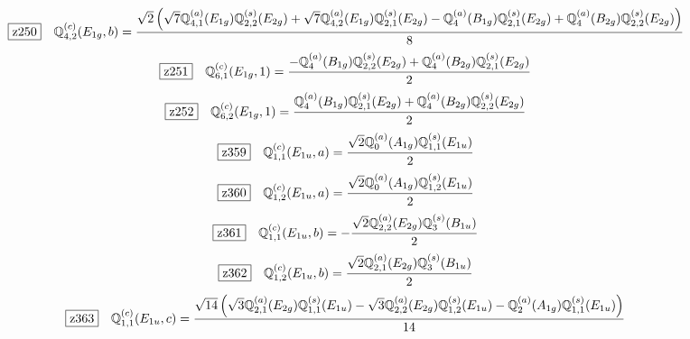 \documentclass[fleqn,10pt,landscape]{jsarticle}
\begin{document}
\begin{dmath*}
\hspace*{3mm}\fbox{z250}\quad \mathbb{Q}_{4,2}^{(c)}(E_{1g},b)=\frac{\sqrt{2} \left(\sqrt{7} \mathbb{Q}_{4,1}^{(a)}(E_{1g}) \mathbb{Q}_{2,2}^{(s)}(E_{2g}) + \sqrt{7} \mathbb{Q}_{4,2}^{(a)}(E_{1g}) \mathbb{Q}_{2,1}^{(s)}(E_{2g}) - \mathbb{Q}_{4}^{(a)}(B_{1g}) \mathbb{Q}_{2,1}^{(s)}(E_{2g}) + \mathbb{Q}_{4}^{(a)}(B_{2g}) \mathbb{Q}_{2,2}^{(s)}(E_{2g})\right)}{8}
\end{dmath*}
\begin{dmath*}
\hspace*{3mm}\fbox{z251}\quad \mathbb{Q}_{6,1}^{(c)}(E_{1g},1)=\frac{- \mathbb{Q}_{4}^{(a)}(B_{1g}) \mathbb{Q}_{2,2}^{(s)}(E_{2g}) + \mathbb{Q}_{4}^{(a)}(B_{2g}) \mathbb{Q}_{2,1}^{(s)}(E_{2g})}{2}
\end{dmath*}
\begin{dmath*}
\hspace*{3mm}\fbox{z252}\quad \mathbb{Q}_{6,2}^{(c)}(E_{1g},1)=\frac{\mathbb{Q}_{4}^{(a)}(B_{1g}) \mathbb{Q}_{2,1}^{(s)}(E_{2g}) + \mathbb{Q}_{4}^{(a)}(B_{2g}) \mathbb{Q}_{2,2}^{(s)}(E_{2g})}{2}
\end{dmath*}
\begin{dmath*}
\hspace*{3mm}\fbox{z359}\quad \mathbb{Q}_{1,1}^{(c)}(E_{1u},a)=\frac{\sqrt{2} \mathbb{Q}_{0}^{(a)}(A_{1g}) \mathbb{Q}_{1,1}^{(s)}(E_{1u})}{2}
\end{dmath*}
\begin{dmath*}
\hspace*{3mm}\fbox{z360}\quad \mathbb{Q}_{1,2}^{(c)}(E_{1u},a)=\frac{\sqrt{2} \mathbb{Q}_{0}^{(a)}(A_{1g}) \mathbb{Q}_{1,2}^{(s)}(E_{1u})}{2}
\end{dmath*}
\begin{dmath*}
\hspace*{3mm}\fbox{z361}\quad \mathbb{Q}_{1,1}^{(c)}(E_{1u},b)=- \frac{\sqrt{2} \mathbb{Q}_{2,2}^{(a)}(E_{2g}) \mathbb{Q}_{3}^{(s)}(B_{1u})}{2}
\end{dmath*}
\begin{dmath*}
\hspace*{3mm}\fbox{z362}\quad \mathbb{Q}_{1,2}^{(c)}(E_{1u},b)=\frac{\sqrt{2} \mathbb{Q}_{2,1}^{(a)}(E_{2g}) \mathbb{Q}_{3}^{(s)}(B_{1u})}{2}
\end{dmath*}
\begin{dmath*}
\hspace*{3mm}\fbox{z363}\quad \mathbb{Q}_{1,1}^{(c)}(E_{1u},c)=\frac{\sqrt{14} \left(\sqrt{3} \mathbb{Q}_{2,1}^{(a)}(E_{2g}) \mathbb{Q}_{1,1}^{(s)}(E_{1u}) - \sqrt{3} \mathbb{Q}_{2,2}^{(a)}(E_{2g}) \mathbb{Q}_{1,2}^{(s)}(E_{1u}) - \mathbb{Q}_{2}^{(a)}(A_{1g}) \mathbb{Q}_{1,1}^{(s)}(E_{1u})\right)}{14}
\end{dmath*}
\end{document}
